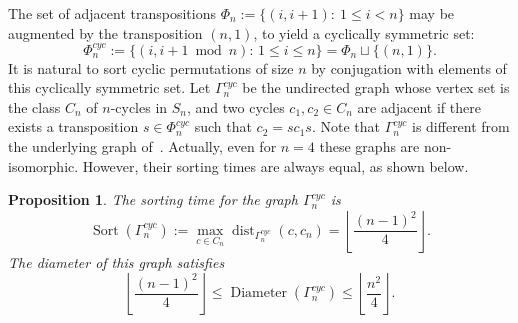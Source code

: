 \documentclass[11pt]{amsart}
\newtheorem{proposition}[theorem]{Proposition}
\numberwithin{equation}{section}
\newcommand{\todo}[1]{\vspace{5 mm}\par \noindent
\marginpar{\textsc{ToDo}} \framebox{\begin{minipage}[c]{0.95
\textwidth}
 #1 \end{minipage}}\vspace{5 mm}\par}
\newcommand{\dist}{{\operatorname{dist}}}
\newcommand{\D}{{\operatorname{Diameter}}}
\newcommand{\Sort}{{\operatorname{Sort}}}
\begin{document}
The set of adjacent transpositions $\Phi_n := \{(i,i+1):\ 1\le i<n\}$ may be augmented by the transposition $(n,1)$, to yield a cyclically symmetric set:
\[
    \Phi^{cyc}_n
    := \{(i,i+1 \bmod n) :\, 1\le i\le n\}
    = \Phi_n \sqcup \{(n,1)\}.
\]
It is natural to sort cyclic permutations of size $n$ by conjugation with elements of this cyclically symmetric set. 
Let $\Gamma^{cyc}_n$ be the undirected graph whose vertex set is the class $C_n$ of $n$-cycles in $S_n$, and two cycles $c_1, c_2 \in C_n$ are adjacent if there exists a transposition $s \in \Phi^{cyc}_n$ such that $c_2 = s c_1 s$.
Note that $\Gamma^{cyc}_n$ is different from the underlying graph of~\cite{AAR}. %
 Actually, even for $n=4$ these graphs are non-isomorphic. 
However, their sorting times are always equal, as shown below. 





\begin{proposition}
    The sorting time for the graph $\Gamma^{cyc}_n$ 
    is 
    \[
        \Sort(\Gamma^{cyc}_n):= \max_{c \in C_n} \dist_{\Gamma^{cyc}_n} (c,c_n)
        = \left\lfloor \frac{(n-1)^2}{4} \right\rfloor.
    \]
    The diameter of this graph satisfies
    \[
        \left\lfloor \frac{(n-1)^2}{4} \right\rfloor
        \le \D(\Gamma^{cyc}_n)
        \le \left\lfloor \frac{n^2}{4} \right\rfloor .
    \]
\end{proposition}
\end{document}
